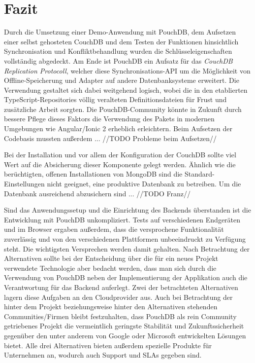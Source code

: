 \chapter{Fazit}
\label{Fazit}
Durch die Umsetzung einer Demo-Anwendung mit PouchDB, dem Aufsetzen einer selbst gehosteten CouchDB und dem Testen der Funktionen hinsichtlich Synchronisation und Konfliktbehandlung wurden die Schlüsseleigenschaften vollständig abgedeckt. Am Ende ist PouchDB ein Aufsatz für das \emph{CouchDB Replication Protocoll}, welcher diese Synchronisations-API um die Möglichkeit von Offline-Speicherung und Adapter auf andere Datenbanksysteme erweitert. Die Verwendung gestaltet sich dabei weitgehend logisch, wobei die in den etablierten TypeScript-Repositories völlig veralteten Definitionsdateien für Frust und zusätzliche Arbeit sorgten. Die PouchDB-Community könnte in Zukunft durch bessere Pflege dieses Faktors die Verwendung des Pakets in modernen Umgebungen wie Angular/Ionic 2 erheblich erleichtern. Beim Aufsetzen der Codebasis mussten außerdem ... //TODO Probleme beim Aufsetzen//

Bei der Installation und vor allem der Konfiguration der CouchDB sollte viel Wert auf die Absicherung dieser Komponente gelegt werden. Ähnlich wie die berüchtigten, offenen Installationen von MongoDB sind die Standard-Einstellungen nicht geeignet, eine produktive Datenbank zu betreiben. Um die Datenbank ausreichend abzusichern sind ... //TODO Franz//

Sind das Anwendungssetup und die Einrichtung des Backends überstanden ist die Entwicklung mit PouchDB unkompliziert. Tests auf verschiedenen Endgeräten und im Browser ergaben außerdem, dass die versprochene Funktionalität zuverlässig und von den verschiedenen Plattformen unbeeindruckt zu Verfügung steht. Die wichtigsten Versprechen werden damit gehalten.
Nach Betrachtung der Alternativen sollte bei der Entscheidung über die für ein neues Projekt verwendete Technologie aber bedacht werden, dass man sich durch die Verwendung von PouchDB neben der Implementierung der Applikation auch die Verantwortung für das Backend auferlegt. Zwei der betrachteten Alternativen lagern diese Aufgaben an den Cloudprovider aus. Auch bei Betrachtung der hinter dem Projekt beziehungsweise hinter den Alternativen stehenden Communities/Firmen bleibt festzuhalten, dass PouchDB als rein Community getriebenes Projekt die vermeintlich geringste Stabilität und Zukunftssicherheit gegenüber den unter anderem von Google oder Microsoft entwickelten Lösungen bietet. Alle drei Alternativen bieten außerdem spezielle Produkte für Unternehmen an, wodurch auch Support und SLAs gegeben sind.
